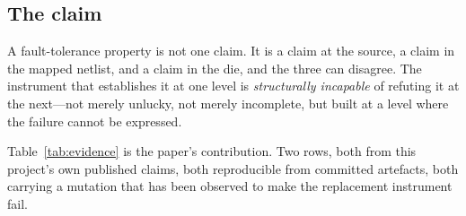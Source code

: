 \documentclass[11pt,a4paper]{article}
\begin{document}
\subsection{The claim}

A fault-tolerance property is not one claim. It is a claim at the source,
a claim in the mapped netlist, and a claim in the die, and the three can
disagree. The instrument that establishes it at one level is
\emph{structurally incapable} of refuting it at the next---not merely
unlucky, not merely incomplete, but built at a level where the failure
cannot be expressed.

Table~\ref{tab:evidence} is the paper's contribution. Two rows, both from
this project's own published claims, both reproducible from committed
artefacts, both carrying a mutation that has been observed to make the
replacement instrument fail.
\end{document}
